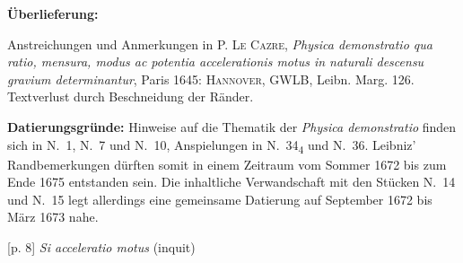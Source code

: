 \begin{ledgroupsized}[r]{120mm}
\footnotesize 
\pstart 
\noindent\textbf{\"{U}berlieferung:}
\pend
\end{ledgroupsized}  
\begin{ledgroupsized}[r]{114mm}
\footnotesize 
\pstart \parindent -6mm
%
Anstreichungen und Anmerkungen in
\textsc{P. Le Cazre},\cite{01022} \textit{Physica demonstratio qua \mbox{ratio}, men\-sura, modus ac potentia accelerationis motus in naturali descensu gravium deter\-mi\-nan\-tur}, Paris 1645:
\textsc{Hannover}, GWLB, Leibn. Marg. 126. Textverlust durch Beschnei\-dung der Ränder.
\pend
\end{ledgroupsized}
\vspace*{5mm}
%
\begin{ledgroup}
\footnotesize 
\pstart
\noindent\footnotesize{\textbf{Datierungsgr\"{u}nde:}
Hinweise auf die Thematik der \textit{Physica demonstratio} finden sich in N.~1, %
N.~7 %
und N.~10, %
Anspielungen in N.~34\textsubscript{4} %
und N.~36. %
Leibniz' Randbemerkungen dürften somit in einem Zeitraum vom Sommer 1672 bis zum Ende 1675 entstanden sein.
Die inhaltliche Verwandschaft mit den Stücken N.~14 %
und N.~15 %
legt allerdings eine gemeinsame Datierung auf September 1672 bis März 1673 nahe.}
\pend
\end{ledgroup}
\count{}
\vspace*{8mm}
\count{}
\pstart 
\normalsize
\noindent
[p. 8]
\textit{Si acceleratio\protect{} motus}
(inquit)
